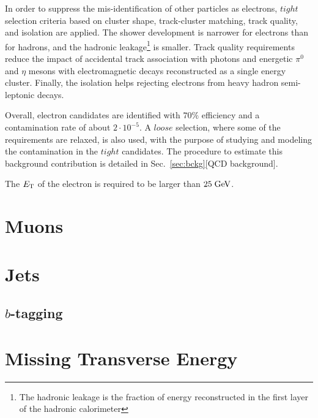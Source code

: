In order to suppress the mis-identification of other particles  
as electrons, $tight$ selection criteria based on cluster shape, 
track-cluster matching, track quality, and isolation are applied.
The shower development is narrower for electrons than for hadrons, and
the hadronic leakage\footnote{The hadronic leakage is the fraction of 
energy reconstructed in the first layer of the hadronic calorimeter}
is smaller. Track quality requirements reduce the impact of accidental 
track association with photons and energetic $\pi^0$ and $\eta$ mesons
with electromagnetic decays reconstructed as a single energy cluster.
Finally, the isolation helps rejecting electrons from heavy hadron 
semi-leptonic decays.

Overall, electron candidates are identified with \mbox{\approx{}$70\%$} 
efficiency and a contamination rate of about \mbox{$2\cdot{}10^{-5}$}.
A $loose$ selection, where some of the requirements are relaxed, 
is also used, with the purpose of studying and modeling the contamination
in the $tight$ candidates. The procedure to estimate this background
contribution is detailed in Sec.~\ref{sec:bckg}[QCD background].

The $\mbox{\ensuremath{E_{\mathrm{T}}}}$ of the electron is required to be larger than \mbox{$25 \; \mathrm{GeV}$}.

\section{Muons}
\label{sec:muons}

\section{Jets}
\label{sec:jets}

\subsection{$b$-tagging}
\label{sec:btag}

\section{Missing Transverse Energy}
\label{sec:met}
